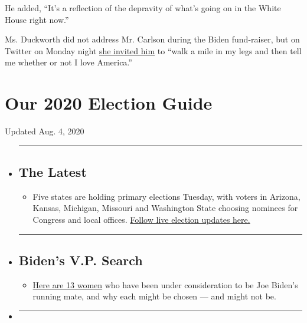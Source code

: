 He added, ``It's a reflection of the depravity of what's going on in the
White House right now.''

Ms. Duckworth did not address Mr. Carlson during the Biden fund-raiser,
but on Twitter on Monday night
\href{https://twitter.com/SenDuckworth/status/1280313123887603712}{she
invited him} to ``walk a mile in my legs and then tell me whether or not
I love America.''

\hypertarget{our-2020-election-guide}{%
\section{Our 2020 Election Guide}\label{our-2020-election-guide}}

Updated Aug. 4, 2020

\begin{itemize}
\item
  \begin{center}\rule{0.5\linewidth}{\linethickness}\end{center}

  \hypertarget{the-latest}{%
  \subsection{The Latest}\label{the-latest}}

  \begin{itemize}
  \tightlist
  \item
    Five states are holding primary elections Tuesday, with voters in
    Arizona, Kansas, Michigan, Missouri and Washington State choosing
    nominees for Congress and local offices.
    \href{https://www.nytimes3xbfgragh.onion/2020/08/04/us/elections/primary-election-michigan-arizona-kansas.html?action=click\&pgtype=Article\&state=default\&region=BELOW_MAIN_CONTENT\&context=storylines_guide}{Follow
    live election updates here.}
  \end{itemize}
\item
  \begin{center}\rule{0.5\linewidth}{\linethickness}\end{center}

  \hypertarget{bidens-vp-search}{%
  \subsection{Biden's V.P. Search}\label{bidens-vp-search}}

  \begin{itemize}
  \tightlist
  \item
    \href{https://www.nytimes3xbfgragh.onion/article/biden-vice-president-2020.html?action=click\&pgtype=Article\&state=default\&region=BELOW_MAIN_CONTENT\&context=storylines_guide}{Here
    are 13 women} who have been under consideration to be Joe Biden's
    running mate, and why each might be chosen --- and might not be.
  \end{itemize}
\item
  \begin{center}\rule{0.5\linewidth}{\linethickness}\end{center}


\end{itemize}
